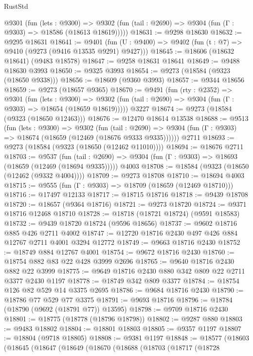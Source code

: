 \begin{lexlean}{RustStd}
\begin{coremodule}
{\begin{coremodule}
{{{{{{{{{{{{{{{{{{{{{{{{{{{{{{{{{{{{{{{{{{{{{{{{{{{{{{{    @9301
      (fun (lets : @9300) =>
      @9302 (fun (tail : @2690) => @9304 (fun (Γ : @9303) => @18586 (@18613 @18619)))))
@18631 := @9298 @18630
@18632 := @9295 @18631
@18641 := @9401
    (fun (U : @9400) => @9402 (fun (t : @7) => @9410 (@9273 (@9416 @13535 @9291) @9427)))
@18645 := @18606 (@18632 @18641) (@9483 @18578)
@18647 := @9258 @18631 @18641
@18649 := @9488 @18630 @3993
@18650 := @9325 @3993
@18654 := @9273 (@18584 (@9323 (@18650 @9338)))
@18656 := @18609 (@9360 @3993)
@18657 := @9344 @18656
@18659 := @9273 (@18657 @9365)
@18670 := @9491
    (fun (rty : @2352) =>
    @9301
      (fun (lets : @9300) =>
      @9302 (fun (tail : @2690) => @9304 (fun (Γ : @9303) => @18654 (@18659 @18619)))))
    @3227
@18674 := @9273 (@18584 (@9323 (@18650 @12463)))
@18676 := @12470 @18614 @13538
@18688 := @9513
    (fun (lets : @9300) =>
    @9302
      (fun (tail : @2690) =>
      @9304 (fun (Γ : @9303) => @18674 (@18659 (@12469 (@18676 @9333 @9335))))))
    @2711
@18693 := @9273 (@18584 (@9323 (@18650 (@12462 @11010))))
@18694 := @18676 @2711
@18703 := @9537
    (fun (tail : @2690) => @9304 (fun (Γ : @9303) => @18693 (@18659 (@12469 (@18694 @9335)))))
    @4003
@18708 := @18584 (@9323 (@18650 (@12462 (@9332 @4004))))
@18709 := @9273 @18708
@18710 := @18694 @4003
@18715 := @9555 (fun (Γ : @9303) => @18709 (@18659 (@12469 @18710)))
@18716 := @17497 @12133
@18717 := @18715 @18716
@18718 := @9439 @18708
@18720 := @18657 (@9364 @18716)
@18721 := @9273 @18720
@18724 := @9371 @18716 @12468 @18710
@18728 := @18718 (@18721 @18724) (@9591 @18583)
@18732 := @9439 @18720 @18724 (@9596 @18656)
@18737 := @9602 @18716 @885 @426 @2711 @4002
@18747 := @12720 @18716 @2430 @497 @426 @884 @12767 @2711 @4001 @3294 @12772
@18749 := @9663 @18716 @2430
@18752 := @18749 @884 @12767 @4001
@18754 := @9672 @18716 @2430
@18760 := @18754 @882 @83 @22 @428 @3999 @2696
@18765 := @9640 @18716 @2430 @882 @22 @3999
@18775 := @9649 @18716 @2430 @880 @342 @809 @22 @2711 @3377 @2430 @1197
@18778 := @18749 @342 @809 @3377
@18784 := @18754 @126 @82 @529 @14 @3375 @2695
@18786 := @9684 @18716 @2430
@18790 := @18786 @77 @529 @77 @3375
@18791 := @9693 @18716
@18796 := @18784 (@18790 (@9692 (@18791 @77)) @13595)
@18798 := @9709 @18716 @2430
@18801 := @18775 (@18778 (@18796 @18798))
@18802 := @9287 @880
@18803 := @9483 @18802
@18804 := @18801 @18803
@18805 := @9357 @1197
@18807 := @18804 (@9718 @18805)
@18808 := @9381 @1197
@18848 := @18577
    (@18603
      (@18645
        (@18647
          (@18649
            (@18670
              (@18688
                (@18703
                  (@18717
                    (@18728
}}}}}}}}}}}}}}}}}}}}}}}}}}}}}}}}}}}}}}}}}}}}}}}}}}}}}}}
\end{coremodule}}
\end{coremodule}
\end{lexlean}
